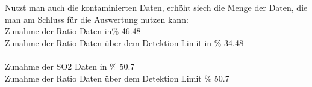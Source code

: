 \documentclass[]{article}
\begin{document}
\FloatBarrier
%
%
%
Nutzt man auch die kontaminierten Daten, erhöht siech die Menge der Daten, die man am Schluss für die Auswertung nutzen kann:\\
%
\newline
%
Zunahme der Ratio Daten in$ \%$ 46.48\\
Zunahme der Ratio Daten über dem Detektion Limit in $\%$ 34.48\\
\\
Zunahme der SO2 Daten in $ \%$ 50.7\\
Zunahme der Ratio Daten über dem Detektion Limit $ \%$ 50.7\\
\end{document}
